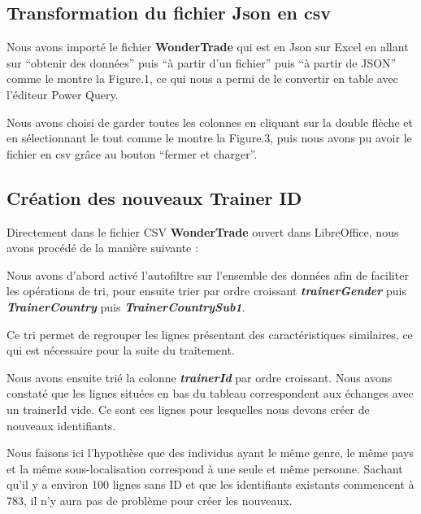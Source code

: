 \documentclass[mstat,12pt]{unswthesis}
\begin{document}
\subsection{Transformation du fichier Json en
csv}\label{transformation-du-fichier-json-en-csv}

Nous avons importé le fichier \textbf{WonderTrade} qui est en Json sur
Excel en allant sur ``obtenir des données'' puis ``à partir d'un
fichier'' puis ``à partir de JSON'' comme le montre la Figure.1, ce qui
nous a permi de le convertir en table avec l'éditeur Power Query.

\bigskip

Nous avons choisi de garder toutes les colonnes en cliquant sur la
double flèche et en sélectionnant le tout comme le montre la Figure.3,
puis nous avons pu avoir le fichier en csv grâce au bouton ``fermer et
charger''.

\bigskip

\subsection{Création des nouveaux Trainer
ID}\label{cruxe9ation-des-nouveaux-trainer-id}

Directement dans le fichier CSV \textbf{WonderTrade} ouvert dans
LibreOffice, nous avons procédé de la manière suivante :

\bigskip

Nous avons d'abord activé l'autofiltre sur l'ensemble des données afin
de faciliter les opérations de tri, pour ensuite trier par ordre
croissant \textbf{\emph{trainerGender}} puis
\textbf{\emph{TrainerCountry}} puis \textbf{\emph{TrainerCountrySub1}}.

\bigskip

Ce tri permet de regrouper les lignes présentant des caractéristiques
similaires, ce qui est nécessaire pour la suite du traitement.

\bigskip

Nous avons ensuite trié la colonne \textbf{\emph{trainerId}} par ordre
croissant. Nous avons constaté que les lignes situées en bas du tableau
correspondent aux échanges avec un trainerId vide. Ce sont ces lignes
pour lesquelles nous devons créer de nouveaux identifiants.

\bigskip

Nous faisons ici l'hypothèse que des individus ayant le même genre, le
même pays et la même sous-localisation correspond à une seule et même
personne. Sachant qu'il y a environ 100 lignes sans ID et que les
identifiants existants commencent à 783, il n'y aura pas de problème
pour créer les nouveaux.
\end{document}
